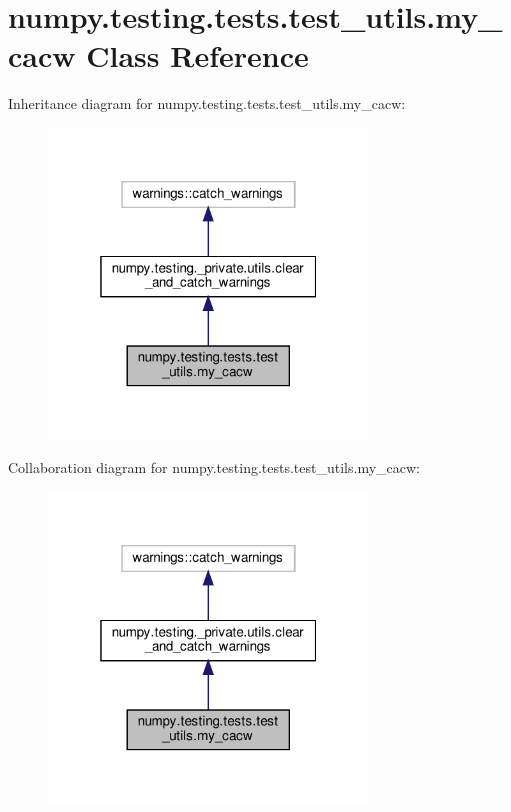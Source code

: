 \hypertarget{classnumpy_1_1testing_1_1tests_1_1test__utils_1_1my__cacw}{}\section{numpy.\+testing.\+tests.\+test\+\_\+utils.\+my\+\_\+cacw Class Reference}
\label{classnumpy_1_1testing_1_1tests_1_1test__utils_1_1my__cacw}


Inheritance diagram for numpy.\+testing.\+tests.\+test\+\_\+utils.\+my\+\_\+cacw\+:
\nopagebreak
\begin{figure}[H]
\begin{center}
\leavevmode
\includegraphics[width=241pt]{classnumpy_1_1testing_1_1tests_1_1test__utils_1_1my__cacw__inherit__graph}
\end{center}
\end{figure}


Collaboration diagram for numpy.\+testing.\+tests.\+test\+\_\+utils.\+my\+\_\+cacw\+:
\nopagebreak
\begin{figure}[H]
\begin{center}
\leavevmode
\includegraphics[width=241pt]{classnumpy_1_1testing_1_1tests_1_1test__utils_1_1my__cacw__coll__graph}
\end{center}
\end{figure}
